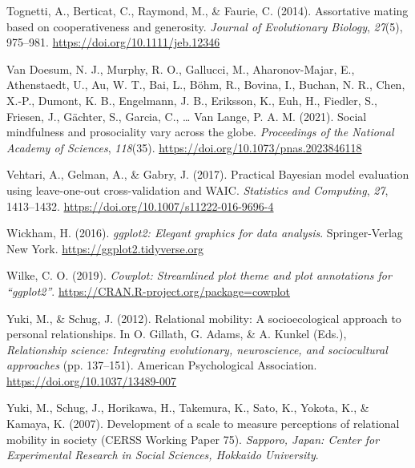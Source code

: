 \documentclass[
  man,floatsintext]{apa6}
\newlength{\cslhangindent}
\newlength{\cslentryspacingunit} %
\newenvironment{CSLReferences}[2] %
 {%
  \setlength{\parindent}{0pt}
  \ifodd #1
  \let\oldpar\par
  \def\par{\hangindent=\cslhangindent\oldpar}
  \fi
  \setlength{\parskip}{#2\cslentryspacingunit}
 }%
 {}
\begin{document}
\begin{CSLReferences}{1}{0}
\leavevmode{}%
Tognetti, A., Berticat, C., Raymond, M., \& Faurie, C. (2014). Assortative mating based on cooperativeness and generosity. \emph{Journal of Evolutionary Biology}, \emph{27}(5), 975--981. \url{https://doi.org/10.1111/jeb.12346}

\leavevmode{}%
Van Doesum, N. J., Murphy, R. O., Gallucci, M., Aharonov-Majar, E., Athenstaedt, U., Au, W. T., Bai, L., Böhm, R., Bovina, I., Buchan, N. R., Chen, X.-P., Dumont, K. B., Engelmann, J. B., Eriksson, K., Euh, H., Fiedler, S., Friesen, J., Gächter, S., Garcia, C., \ldots{} Van Lange, P. A. M. (2021). Social mindfulness and prosociality vary across the globe. \emph{Proceedings of the National Academy of Sciences}, \emph{118}(35). \url{https://doi.org/10.1073/pnas.2023846118}

\leavevmode{}%
Vehtari, A., Gelman, A., \& Gabry, J. (2017). Practical {B}ayesian model evaluation using leave-one-out cross-validation and {WAIC}. \emph{Statistics and Computing}, \emph{27}, 1413--1432. \url{https://doi.org/10.1007/s11222-016-9696-4}

\leavevmode{}%
Wickham, H. (2016). \emph{{ggplot2}: Elegant graphics for data analysis}. Springer-Verlag New York. \url{https://ggplot2.tidyverse.org}

\leavevmode{}%
Wilke, C. O. (2019). \emph{Cowplot: Streamlined plot theme and plot annotations for {``{ggplot2}''}}. \url{https://CRAN.R-project.org/package=cowplot}

\leavevmode{}%
Yuki, M., \& Schug, J. (2012). Relational mobility: A socioecological approach to personal relationships. In O. Gillath, G. Adams, \& A. Kunkel (Eds.), \emph{Relationship science: Integrating evolutionary, neuroscience, and sociocultural approaches} (pp. 137--151). American Psychological Association. \url{https://doi.org/10.1037/13489-007}

\leavevmode{}%
Yuki, M., Schug, J., Horikawa, H., Takemura, K., Sato, K., Yokota, K., \& Kamaya, K. (2007). Development of a scale to measure perceptions of relational mobility in society ({CERSS Working Paper 75}). \emph{Sapporo, Japan: Center for Experimental Research in Social Sciences, Hokkaido University}.

\end{CSLReferences}
\end{document}
